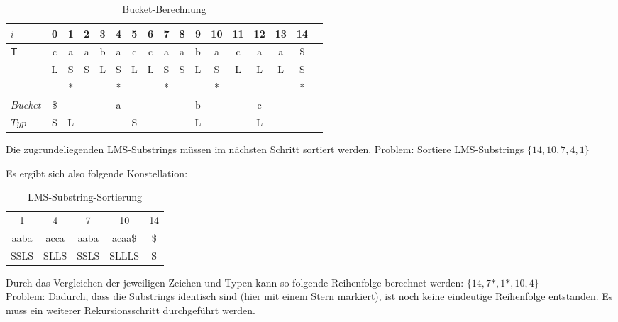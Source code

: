 \begin{table}[H]
\centering
  \begin{tabular}{ | l | c | c | c | c | c | c | c | c | c | c | c | c | c | c | c | c | }
    \hline
        $i$ & 0 & 1 & 2 & 3 & 4 & 5 & 6 & 7 & 8 & 9 & 10 & 11 & 12 & 13 & 14 \\ \hline
        $\mathsf{T}$ & c & a & a & b & a & c & c & a & a & b & a & c & a & a & \$ \\ \hline
            & L & S & S & L & S & L & L & S & S & L & S & L & L & L & S \\ \hline
            &   & * &   &   & * &   &   & * &   &   & * &   &   &   & * \\ \hline
   $Bucket$ &\$ & \multicolumn{7}{c}{a} &   & \multicolumn{1}{c}{b} &   & \multicolumn{3}{c}{c} & \\ \hline
      $Typ$ & S & \multicolumn{1}{c}{L} &   & \multicolumn{5}{c}{S} &   & \multicolumn{1}{c}{L} &    & \multicolumn{3}{c}{L} &\\
    \hline
  \end{tabular}
  \caption{Bucket-Berechnung}
\end{table}
\bigskip

\noindent Die zugrundeliegenden LMS-Substrings müssen im nächsten Schritt sortiert werden. Problem: Sortiere LMS-Substrings $\{14, 10, 7, 4, 1\}$ \newpage

\noindent Es ergibt sich also folgende Konstellation:

\begin{table}[H]
\centering
	\begin{tabular}{c|c|c|c|c}
			 1 	     &            4          &          7            &           10            &          14 \\
          	aaba     &          acca         &        aaba           &          acaa\$         &          \$  \\
         	SSLS     &          SLLS         &        SSLS           &          SLLLS          &           S
	\end{tabular}
	\caption{LMS-Substring-Sortierung}
\end{table}
\bigskip

\noindent Durch das Vergleichen der jeweiligen Zeichen und Typen kann so folgende Reihenfolge berechnet werden: $\{14, 7*, 1*, 10, 4\}$ \\
\noindent Problem: Dadurch, dass die Substrings identisch sind (hier mit einem Stern markiert), ist noch keine eindeutige Reihenfolge entstanden. Es muss ein weiterer Rekursionsschritt durchgeführt werden.

